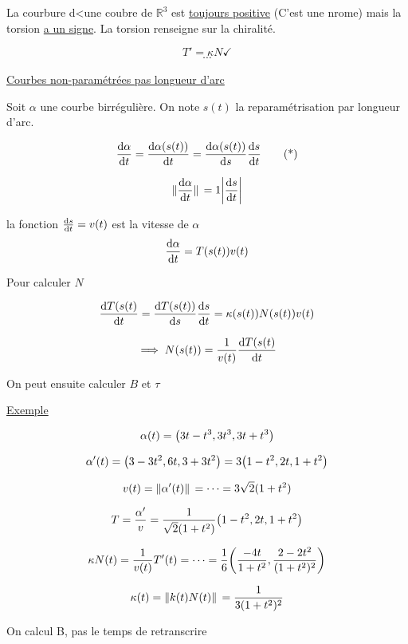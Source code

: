 \documentclass{article}
\begin{document}
\begin{tcolorbox}[title=Remarque]
	La courbure d<une coubre de $\mathbb{R}^3$ est \underline{toujours positive} (C'est une nrome) mais la torsion \underline{a un signe}. La torsion renseigne sur la chiralité.
\end{tcolorbox}


$$T'= \kappa N \checkmark$$ 
$$\cdots$$

\underline{Courbes non-paramétrées pas longueur d'arc}

Soit $\alpha$ une courbe birrégulière. On note $s(t)$ la reparamétrisation par longueur d'arc.

\begin{equation*}
	\dv{\alpha}{t} = \dv{\alpha(s(t))}{t} = \dv{\alpha(s(t))}{s}\dv{s}{t} \tag{*}
\end{equation*}

$$\norm*{\dv{\alpha}{t}} = 1 \abs{\dv{s}{t}}$$

la fonction $\dv{s}{t} = v(t)$ est la vitesse de $\alpha$
$$\dv{\alpha}{t} = T(s(t))v(t)$$

Pour calculer $N$

$$\dv{T(s(t)}{t} = \dv{T(s(t))}{s}\dv{s}{t} = \kappa(s(t))N(s(t))v(t)$$

$$\implies N(s(t)) =\frac{1}{v(t)}\dv{T(s(t)}{t} $$

On peut ensuite calculer $B$ et $\tau$

\pagebreak
\underline{Exemple}

$$\alpha(t) = \qty(3t-t^3, 3t^3, 3t+t^3)$$

$$\alpha'(t) = \qty(3-3t^2, 6t, 3+3 t^2) = 3\qty(1-t^2, 2t, 1+t^2)$$

$$v(t)= \norm*{\alpha'(t)}=\dots = 3\sqrt{2}(1+t^2)$$

$$T=\frac{\alpha'}{v}= \frac{1}{\sqrt 2(1+t^2)}\qty(1-t^2, 2t, 1+t^2)$$

$$\kappa N(t) = \frac{1}{v(t)}T'(t)=\dots=\frac 16 \qty(\frac{-4t}{1+t^2},\frac{2-2t^2}{(1+t^2)^2})$$


$$\kappa(t)=\norm*{k(t)N(t)}=\frac{1}{3(1+t^2)^2}$$

On calcul B, pas le temps de retranscrire
\end{document}
